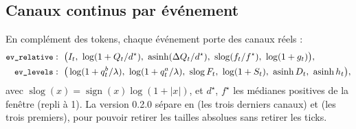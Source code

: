 \subsection{Canaux continus par événement}
En complément des tokens, chaque événement porte des canaux réels :
\begin{align}
\code{ev\_relative}&:\ \big(I_t,\ \log(1+Q_t/d^\star),\ \operatorname{asinh}(\Delta Q_t/d^\star),\ \operatorname{slog}(f_t/f^\star),\ \log(1+g_t)\big),\\
\code{ev\_levels}&:\ \big(\log(1+q^b_t/\lot),\ \log(1+q^a_t/\lot),\ \operatorname{slog}F_t,\ \log(1+S_t),\ \operatorname{asinh}D_t,\ \operatorname{asinh}h_t\big),
\end{align}
avec $\operatorname{slog}(x)=\operatorname{sign}(x)\log(1+|x|)$, et $d^\star$, $f^\star$ les médianes positives de la fenêtre (repli à 1). La version 0.2.0 sépare  en  (les trois derniers canaux) et  (les trois premiers), pour pouvoir retirer les tailles absolues sans retirer les ticks.
